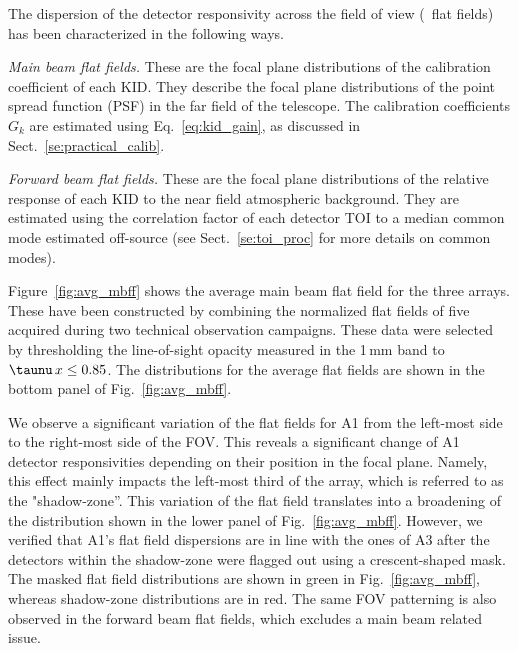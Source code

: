 The dispersion of the detector responsivity across the field of view (\aka\ flat
fields) has been characterized in the following ways.

\noindent \emph{Main beam flat fields.} These are the focal plane
distributions of the calibration coefficient of each KID. {\lp They describe the
focal plane distributions of the point spread function (PSF) in
the far field of the telescope.} The calibration coefficients $G_k$ are
estimated using Eq.~\ref{eq:kid_gain}, as discussed in
Sect.~\ref{se:practical_calib}. 

\noindent \emph{Forward beam flat fields.} These are the focal plane
distributions of the relative response of
each KID to the near field atmospheric background. They are estimated
using the correlation factor of each detector TOI 
to a median common mode estimated off-source (see Sect.~\ref{se:toi_proc} for
more details on common modes).

Figure~\ref{fig:avg_mbff} %
shows the average main beam %
flat field for the three arrays. These have been constructed by
combining the normalized flat fields of five \bms acquired during two
technical observation campaigns. These data were
selected by thresholding the line-of-sight opacity measured in the
1\,mm band to $\taunu\,x \leq 0.85$. The distributions for the average flat
fields are shown in the bottom panel of Fig.~\ref{fig:avg_mbff}.%

We observe a significant variation of the flat fields for A1 from the left-most side
to the right-most side of the FOV. This reveals a significant change of A1
detector responsivities depending on their position in the focal plane. Namely, this
effect mainly impacts the left-most third of the array, which is
referred to as the "shadow-zone''. This variation of the
flat field translates into a broadening of the distribution shown in
the lower panel of Fig.~\ref{fig:avg_mbff}.  However,
we verified that A1's flat field dispersions are in line with the ones of A3 after the
detectors within the shadow-zone were flagged out using a
crescent-shaped mask. The masked flat field distributions are shown in
green in Fig.~\ref{fig:avg_mbff}, %
whereas shadow-zone distributions are in red. The same FOV patterning
is also observed in the forward beam flat fields, which excludes a
main beam related issue. 


